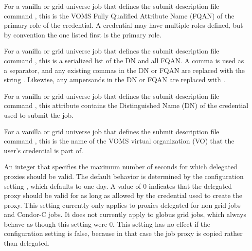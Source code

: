 \begin{description}
\item[\AdAttr{X509UserProxyFirstFQAN}:]   
For a vanilla or grid universe job that defines the submit description
file command , 
this is the VOMS Fully Qualified Attribute Name (FQAN) of
the primary role of the credential. 
A credential may have multiple roles defined, 
but by convention the one listed first is the primary role. 

\item[\AdAttr{X509UserProxyFQAN}:]   
For a vanilla or grid universe job that defines the submit description
file command , 
this is a serialized list of the DN and all FQAN.
A comma is used as a separator,
and any existing commas in the DN or FQAN are replaced with the string
.
Likewise, any ampersands in the DN or FQAN are replaced with
.

\item[\AdAttr{X509UserProxySubject}:]   
For a vanilla or grid universe job that defines the submit description
file command , 
this attribute contains the Distinguished Name (DN) of the credential
used to submit the job.

\item[\AdAttr{X509UserProxyVOName}:]   
For a vanilla or grid universe job that defines the submit description
file command , 
this is the name of the VOMS virtual organization (VO) that 
the user's credential is part of. 

\item[\AdAttr{DelegateJobGSICredentialsLifetime}:]   
An integer that specifies the maximum number of seconds for which
delegated proxies should be valid.  The default behavior is determined
by the configuration
setting , which
defaults to one day.  A value of 0 indicates that the delegated proxy
should be valid for as long as allowed by the credential used to
create the proxy.  This setting currently only applies to proxies
delegated for non-grid jobs and Condor-C jobs.  It does not currently
apply to globus grid jobs, which always behave as though this setting
were 0.  This setting has no effect if the configuration
setting  is false, because in
that case the job proxy is copied rather than delegated.

\end{description}

